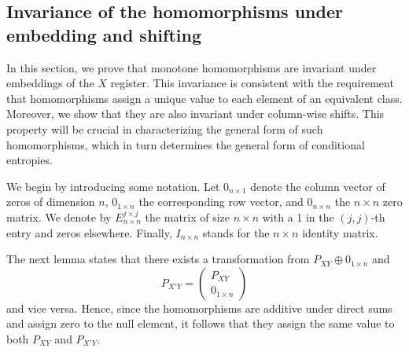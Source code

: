 \documentclass[aps,pra,11pt,onecolumn,nofootinbib,tightenlines]{revtex4-2}
\theoremstyle{definition}
\begin{document}
\subsection{Invariance of the homomorphisms under embedding and shifting}
\label{sec: invariance embedding and shifting}
In this section, we prove that monotone homomorphisms are invariant under embeddings of the $X$ register. This invariance is consistent with the requirement that homomorphisms assign a unique value to each element of an equivalent class. Moreover, we show that they are also invariant under column-wise shifts.
This property will be crucial in characterizing the general form of such homomorphisms, which in turn determines the general form of conditional entropies. 

\bigskip
We begin by introducing some notation. Let $0_{n \times 1}$ denote the column vector of zeros of dimension $n$, $0_{1 \times n}$ the corresponding row vector, and $0_{n \times n}$ the $n \times n$ zero matrix. We denote by $E^{j \times j}_{n \times n}$ the matrix of size $n \times n$ with a 1 in the $(j, j)$-th entry and zeros elsewhere. Finally, $I_{n \times n}$ stands for the $n \times n$ identity matrix.

The next lemma states that there exists a transformation from $P_{XY}\oplus 0_{1\times n} $ and
\begin{equation}
    P_{X'Y} = \begin{pmatrix}
        P_{XY}\\
        0_{1 \times n} 
    \end{pmatrix}
\end{equation}
and vice versa. Hence, since the homomorphisms are additive under direct sums and assign zero to the null element, it follows that they assign the same value to both $P_{XY}$ and $P_{X'Y}$.
\end{document}
